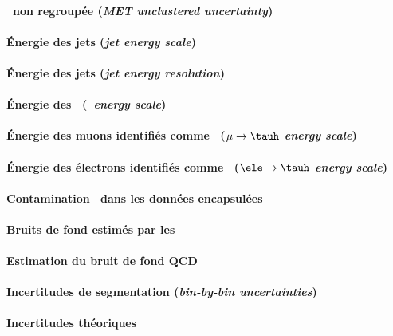 \paragraph{\MET\ non regroupée (\emph{MET unclustered uncertainty})}

\paragraph{Énergie des jets (\emph{jet energy scale})}

\paragraph{Énergie des jets (\emph{jet energy resolution})}

\paragraph{Énergie des \tauh\ (\emph{\tauh\ energy scale})}

\paragraph{Énergie des muons identifiés comme \tauh\ (\emph{$\mu\to\tauh$ energy scale})}

\paragraph{Énergie des électrons identifiés comme \tauh\ (\emph{$\ele\to\tauh$ energy scale})}

\paragraph{Contamination \ttbar\ dans les données encapsulées}

\paragraph{Bruits de fond estimés par les \fakefactors}

\paragraph{Estimation du bruit de fond QCD}

\paragraph{Incertitudes de segmentation (\emph{bin-by-bin uncertainties})}

\paragraph{Incertitudes théoriques}
